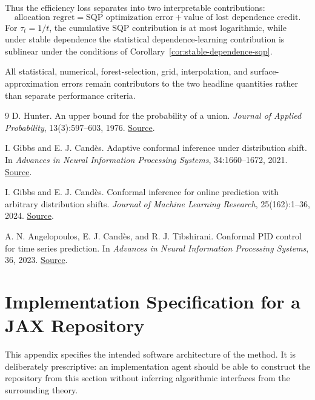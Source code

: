 \documentclass[11pt]{article}
\begin{document}
Thus the efficiency loss separates into two interpretable contributions:
\[
    \boxed{
    \text{allocation regret}
    =
    \text{SQP optimization error}
    +
    \text{value of lost dependence credit}.
    }
\]
For $\tau_t=1/t$, the cumulative SQP contribution is at most logarithmic,
while under stable dependence the statistical dependence-learning contribution
is sublinear under the conditions of
Corollary~\ref{cor:stable-dependence-sqp}.

All statistical, numerical, forest-selection, grid, interpolation, and
surface-approximation errors remain contributors to the two headline
quantities rather than separate performance criteria.

\begin{thebibliography}{9}
D. Hunter.
\newblock An upper bound for the probability of a union.
\newblock \emph{Journal of Applied Probability}, 13(3):597--603, 1976.
\newblock \href{https://www.cambridge.org/core/journals/journal-of-applied-probability/article/abs/an-upper-bound-for-the-probability-of-a-union/092D711504BA968EF0D1D903A2685D60}{Source}.

I. Gibbs and E. J. Cand\`es.
\newblock Adaptive conformal inference under distribution shift.
\newblock In \emph{Advances in Neural Information Processing Systems}, 34:1660--1672, 2021.
\newblock \href{https://proceedings.neurips.cc/paper/2021/hash/0d441de75945e5acbc865406fc9a2559-Abstract.html}{Source}.

I. Gibbs and E. J. Cand\`es.
\newblock Conformal inference for online prediction with arbitrary distribution shifts.
\newblock \emph{Journal of Machine Learning Research}, 25(162):1--36, 2024.
\newblock \href{https://jmlr.org/papers/volume25/22-1218/22-1218.pdf}{Source}.

A. N. Angelopoulos, E. J. Cand\`es, and R. J. Tibshirani.
\newblock Conformal PID control for time series prediction.
\newblock In \emph{Advances in Neural Information Processing Systems}, 36, 2023.
\newblock \href{https://arxiv.org/abs/2307.16895}{Source}.
\end{thebibliography}

\appendix
\section{Implementation Specification for a JAX Repository}
\label{app:implementation-specification}

This appendix specifies the intended software architecture of the method.
It is deliberately prescriptive: an implementation agent should be able to
construct the repository from this section without inferring algorithmic
interfaces from the surrounding theory.
\end{document}
